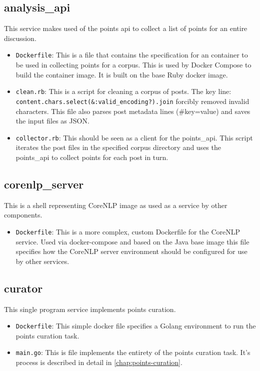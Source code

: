 \subsection*{analysis\_api}
  This service makes used of the points api to collect a list of points for an entire discussion.
  \begin{itemize}
    \item
      \texttt{Dockerfile}: This is a file that contains the specification for an container to be used in collecting points for a corpus. This is used by Docker Compose to build the container image. It is built on the base Ruby docker image.
    \item
      \texttt{clean.rb}: This is a script for cleaning a corpus of posts. The key line: \texttt{content.chars.select(\&:valid\_encoding?).join} forcibly removed invalid characters. This file also parses post metadata lines (\#key=value) and saves the input files as JSON.
    \item
      \texttt{collector.rb}: This should be seen as a client for the points\_api. This script iterates the post files in the specified corpus directory and uses the points\_api to collect points for each post in turn.
  \end{itemize}

\subsection*{corenlp\_server}
  This is a shell representing CoreNLP image as used as a service by other components.
  \begin{itemize}
    \item
      \texttt{Dockerfile}: This is a more complex, custom Dockerfile for the CoreNLP service. Used via docker-compose and based on the Java base image this file specifies how the CoreNLP server environment should be configured for use by other services.
  \end{itemize}

\subsection*{curator}
  This single program service implements points curation.
  \begin{itemize}
    \item
      \texttt{Dockerfile}: This simple docker file specifies a Golang environment to run the points curation task.
    \item
      \texttt{main.go}: This is file implements the entirety of the points curation task. It's process is described in detail in \ref{chap:points-curation}.
  \end{itemize}

